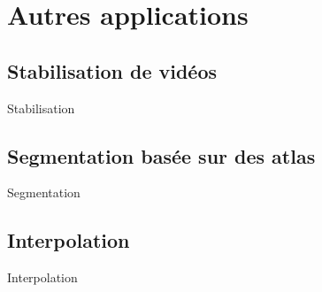 \documentclass{beamer}
\begin{document}
\section{Autres applications}
\subsection{Stabilisation de vidéos}
\begin{frame}{Stabilisation}
 
\end{frame}

\subsection{Segmentation basée sur des atlas}
\begin{frame}{Segmentation}
 
\end{frame}
\subsection{Interpolation}
\begin{frame}{Interpolation}
 
\end{frame}
\end{document}
